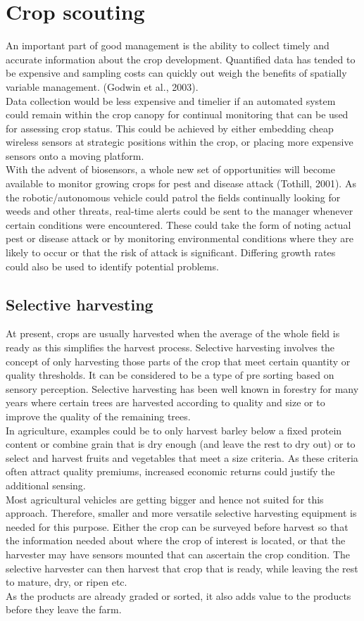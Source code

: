 \documentclass{report}
\begin{document}
\section{Crop scouting}
An important part of good management is the ability to collect timely and accurate
information about the crop development. Quantified data has tended to be expensive and
sampling costs can quickly out weigh the benefits of spatially variable management.
(Godwin et al., 2003).\\
Data collection would be less expensive and timelier if an automated system could remain
within the crop canopy for continual monitoring that can be used for assessing crop status.
This could be achieved by either embedding cheap wireless sensors at strategic positions
within the crop, or placing more expensive sensors onto a moving platform.\\
With the advent of biosensors, a whole new set of opportunities will become available to
monitor growing crops for pest and disease attack (Tothill, 2001). As the
robotic/autonomous vehicle could patrol the fields continually looking for weeds and other
threats, real-time alerts could be sent to the manager whenever certain conditions were
encountered. These could take the form of noting actual pest or disease attack or by
monitoring environmental conditions where they are likely to occur or that the risk of attack
is significant. Differing growth rates could also be used to identify potential problems.
\subsection{Selective harvesting}
At present, crops are usually harvested when the average of the whole field is ready as this
simplifies the harvest process. Selective harvesting involves the concept of only harvesting
those parts of the crop that meet certain quantity or quality thresholds. It can be considered
to be a type of pre sorting based on sensory perception. Selective harvesting has been well
known in forestry for many years where certain trees are harvested according to quality and
size or to improve the quality of the remaining trees.\\
In agriculture, examples could be to only harvest barley below a fixed protein content or
combine grain that is dry enough (and leave the rest to dry out) or to select and harvest
fruits and vegetables that meet a size criteria.
As these criteria often attract quality premiums, increased economic returns could justify the
additional sensing.\\
Most agricultural vehicles are getting bigger and hence not suited for this approach. Therefore, smaller and
more versatile selective harvesting equipment is needed for this purpose. Either the crop can be surveyed
before harvest so that the information needed about where the crop of interest is located, or that the harvester may have sensors mounted that can ascertain the crop condition. The selective harvester can then harvest that crop that is ready, while leaving the rest to mature, dry, or ripen etc.\\
As the products are already graded or sorted, it also adds value to the products before they leave the farm.
\end{document}
